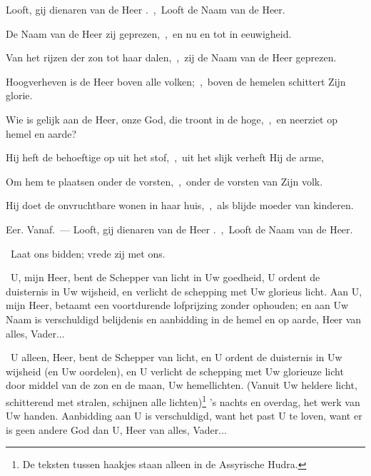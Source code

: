\documentclass[12pt,twoside,a5paper]{article}
\begin{document}
\begin{halfparskip}
   Looft, gij dienaren van de Heer .~\sep\ Looft de Naam van de Heer.

   

  De Naam van de Heer zij geprezen,~\sep\ en nu en tot in eeuwigheid.

  Van het rijzen der zon tot haar dalen,~\sep\ zij de Naam van de Heer geprezen.

  Hoogverheven is de Heer boven alle volken;~\sep\ boven de hemelen schittert Zijn glorie.

  Wie is gelijk aan de Heer, onze God, die troont in de hoge,~\sep\ en neerziet op hemel en aarde?

  Hij heft de behoeftige op uit het stof,~\sep\ uit het slijk verheft Hij de arme,

  Om hem te plaatsen onder de vorsten,~\sep\ onder de vorsten van Zijn volk.

  Hij doet de onvruchtbare wonen in haar huis,~\sep\ als blijde moeder van kinderen.

  Eer. Vanaf.~--- Looft, gij dienaren van de Heer .~\sep\ Looft de Naam van de Heer.

\end{halfparskip}

\begin{halfparskip}
  \dd~Laat ons bidden; vrede zij met ons.

   \cc~U, mijn Heer, bent de Schepper van licht in Uw goedheid, U ordent de duisternis in Uw wijsheid, en verlicht de schepping met Uw glorieus licht. Aan U, mijn Heer, betaamt een voortdurende lofprijzing zonder ophouden; en aan Uw Naam is verschuldigd belijdenis en aanbidding in de hemel en op aarde, Heer van alles, Vader...

   \cc~U alleen, Heer, bent de Schepper van licht, en U ordent de duisternis in Uw wijsheid (en Uw oordelen), en U verlicht de schepping met Uw glorieuze licht door middel van de zon en de maan, Uw hemellichten. (Vanuit Uw heldere licht, schitterend met stralen, schijnen alle lichten)\footnote{De teksten tussen haakjes staan alleen in de Assyrische Hudra.} 's nachts en overdag, het werk van Uw handen. Aanbidding aan U is verschuldigd, want het past U te loven, want er is geen andere God dan U, Heer van alles, Vader...
\end{halfparskip}
\end{document}
